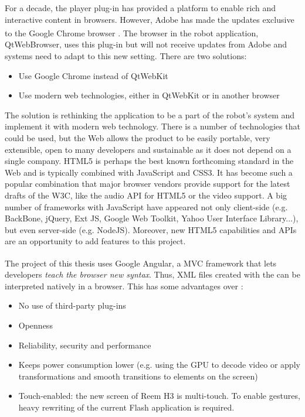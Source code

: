 For a decade, the \flash player plug-in has provided a platform to enable rich and interactive content in browsers.
However, Adobe has made the updates exclusive to the Google Chrome\textsuperscript{\textcopyright}\xspace browser \cite{FlashRoadmap}. 
The browser in the robot application, QtWebBrowser, uses this plug-in but will not receive updates from Adobe and \company systems need to adapt to this new setting. 
There are two solutions:
\begin{itemize}
	\item Use Google Chrome instead of QtWebKit
	\item Use modern web technologies, either in QtWebKit or in another browser
\end{itemize}

The solution is rethinking the application to be a part of the robot's system and implement it with modern web technology.
There is a number of technologies that could be used, but the Web allows the product to be easily portable, very extensible, open to many developers and sustainable as it does not depend on a single company.
\ac{HTML5} is perhaps the best known forthcoming standard in the Web and is typically combined with JavaScript and \ac{CSS3}. 
It has become such a popular combination that major browser vendors provide support for the latest drafts of the \ac{W3C}, like the audio \ac{API} for \ac{HTML5} or the video support.
A big number of frameworks with JavaScript have appeared not only client-side (e.g. BackBone, jQuery, Ext JS, Google Web Toolkit, Yahoo User Interface Library...), but even server-side (e.g. NodeJS).
Moreover, new \ac{HTML5} capabilities and \acp{API} are an opportunity to add features to this project.

The project of this thesis uses Google Angular\textsuperscript{\textcopyright}, a \ac{MVC} framework that lets developers \emph{teach the browser new syntax}. 
Thus, \ac{XML} files created with the \se can be interpreted natively in a browser. 
This has some advantages over \flash \cite{Jobs:ThoughtsOnFlash}:
\begin{itemize}
    \item No use of third-party plug-ins
    \item Openness
    \item Reliability, security and performance
    \item Keeps power consumption lower (e.g. using the GPU to decode video or apply transformations and smooth transitions to elements on the screen)
    \item Touch-enabled: the new screen of Reem H3 is multi-touch. To enable gestures, heavy rewriting of the current Flash application is required.
\end{itemize}


